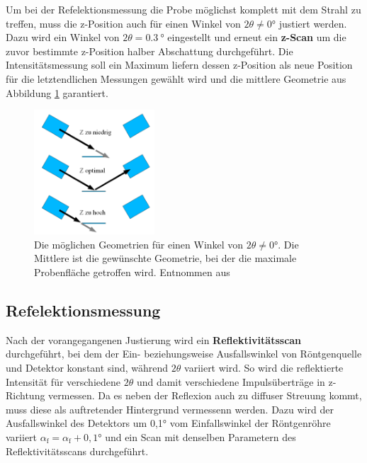         Um bei der Refelektionsmessung die Probe möglichst komplett mit dem Strahl zu treffen, muss die z-Position auch für einen Winkel von $2\theta\neq0°$ justiert werden. Dazu wird ein Winkel von
        $2\theta = \SI{0.3}{\degree}$ eingestellt und erneut ein \textbf{z-Scan} um die zuvor bestimmte z-Position halber Abschattung durchgeführt. Die Intensitätsmessung soll ein Maximum liefern dessen 
        z-Position als neue Position für die letztendlichen Messungen gewählt wird und die mittlere Geometrie aus Abbildung \ref{fig:zScan_Winkel} garantiert.

        \FloatBarrier
        \begin{figure}[h]
            \centering
            \includegraphics[width = 0.4\textwidth]{pictures/zScan_winkel.png}
            \caption{Die möglichen Geometrien für einen Winkel von $2\theta\neq0°$. Die Mittlere ist die gewünschte Geometrie, bei der die maximale Probenfläche getroffen wird. Entnommen aus \cite{tu_dortmund_versuchsanleitung_2022}}
            \label{fig:zScan_Winkel}
          \end{figure}
      
        \FloatBarrier
        
 
    \subsection{Refelektionsmessung}
        Nach der vorangegangenen Justierung wird ein \textbf{Reflektivitätsscan} durchgeführt, bei dem der Ein- beziehungsweise Ausfallswinkel von Röntgenquelle und Detektor konstant sind, während $2\theta$
        variiert wird. So wird die reflektierte Intensität für verschiedene $2\theta$ und damit verschiedene Impulsüberträge in z-Richtung vermessen. Da es neben der Reflexion auch zu diffuser Streuung kommt,
        muss diese als auftretender Hintergrund vermessenn werden. Dazu wird der Ausfallswinkel des Detektors um 0,1° vom Einfallswinkel der Röntgenröhre variiert $\alpha_{\text{f}} = \alpha_{\text{f}} + 0,1°$
        und ein Scan mit denselben Parametern des Reflektivitätsscans durchgeführt.
    \newpage
